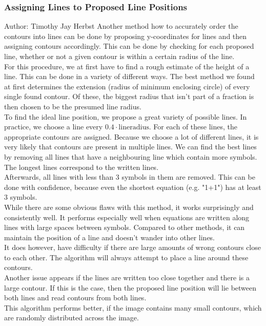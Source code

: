 \documentclass[12pt]{article}
\begin{document}
	\subsubsection{Assigning Lines to Proposed Line Positions}
	\small{Author: Timothy Jay Herbst} \newline \newline
	Another method how to accurately order the contours into lines can be done by proposing y-coordinates for lines and then assigning contours accordingly.
	This can be done by checking for each proposed line, whether or not a given contour is within a certain radius of the line.\\
	For this procedure, we at first have to find a rough estimate of the height of a line.
	This can be done in a variety of different ways.
	The best method we found at first determines the extension (radius of minimum enclosing circle) of every single found contour.
	Of these, the biggest radius that isn't part of a fraction is then chosen to be the presumed line radius.\\
	To find the ideal line position, we propose a great variety of possible lines.
	In practice, we choose a line every $0.4 \cdot \mathrm{line radius}$.
	For each of these lines, the appropriate contours are assigned.
	Because we choose a lot of different lines, it is very likely that contours are present in multiple lines.
	We can find the best lines by removing all lines that have a neighbouring line which contain more symbols.
	The longest lines correspond to the written lines.\\
	Afterwards, all lines with less than 3 symbols in them are removed.
	This can be done with confidence, because even the shortest equation (e.g. "1+1") has at least 3 symbols.\\
	
	While there are some obvious flaws with this method, it works surprisingly and consistently well.
	It performs especially well when equations are written along lines with large spaces between symbols.
	Compared to other methods, it can maintain the position of a line and doesn't wander into other lines.\\
	It does however, have difficulty if there are large amounts of wrong contours close to each other.
	The algorithm will always attempt to place a line around these contours.\\
	Another issue appears if the lines are written too close together and there is a large contour.
	If this is the case, then the proposed line position will lie between both lines and read contours from both lines.\\
	This algorithm performs better, if the image contains many small contours, which are randomly distributed across the image.
	
\end{document}
